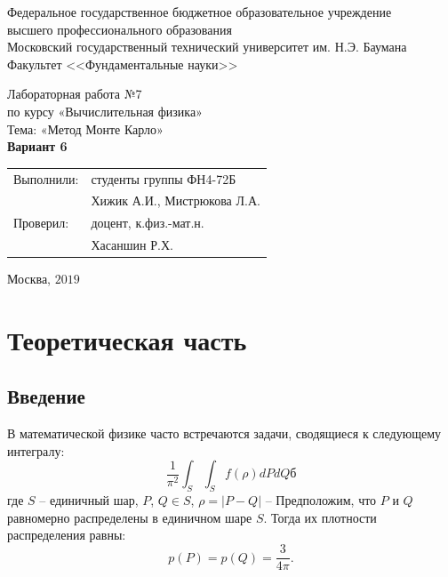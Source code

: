 \documentclass[
11pt,
master, %
subf, %
href, %
colorlinks=true, %
times, %
]{disser}
\begin{document}
\pagestyle{empty}
\begin{center}

\noindent  Федеральное государственное бюджетное образовательное учреждение\\
высшего профессионального образования\\

Московский государственный технический университет им. Н.Э. Баумана \\
Факультет <<Фундаментальные науки>>\bigskip\\

\vfill

Лабораторная работа №7\\
по курсу «Вычислительная физика»\\
Тема: «Метод Монте Карло»\\
\textbf{Вариант 6}\\


\vfill
\vfill
\begin{flushright}
\begin{tabular}{ll}
Выполнили: & студенты группы ФН4-72Б     \\
           & Хижик А.И., Мистрюкова Л.А. \\
Проверил:  & доцент, к.физ.-мат.н.       \\
           & Хасаншин Р.Х.
\end{tabular}
\end{flushright}
\vfill
\begin{center}
Москва, $2019$
\end{center}

\end{center}
\pagebreak


\pagestyle{plain} %
\tableofcontents

\section{Теоретическая часть}
\subsection{Введение}
В математической физике часто встречаются задачи, сводящиеся к следующему интегралу:
\begin{equation}\label{eq1}
  \frac{1}{\pi^2}\int_{S}\int_{S}f(\rho) dPdQб
\end{equation}
где $S$ -- единичный шар, $P$, $Q \in S$, $\rho = |P-Q|$ --
Предположим, что $P$ и $Q$ равномерно распределены в единичном шаре $S$. Тогда их плотности распределения равны:
$$p(P) = p(Q) = \frac{3}{4\pi}.$$
\end{document}
